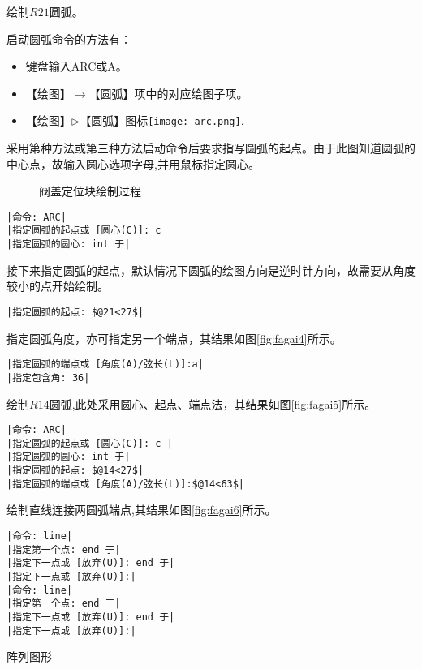 \begin{procedure}
绘制$R21$圆弧。

启动圆弧命令的方法有：
\begin{itemize}
\item 键盘输入ARC或A。
\item 【绘图】$\rightarrow$【圆弧】项中的对应绘图子项。
\item 【绘图】$\triangleright$【圆弧】图标\texttt{[image: arc.png]}.
\end{itemize}
采用第种方法或第三种方法启动命令后要求指写圆弧的起点。由于此图知道圆弧的中心点，故输入圆心选项字母,并用鼠标指定圆心。
\begin{figure}[htbp]
\centering
{}\hspace{30pt}
\hspace{30pt}
\caption{阀盖定位块绘制过程}
\end{figure}
\begin{lstlisting}
|命令: ARC|
|指定圆弧的起点或 [圆心(C)]: c 
|指定圆弧的圆心: int 于|
\end{lstlisting}
接下来指定圆弧的起点，默认情况下圆弧的绘图方向是逆时针方向，故需要从角度较小的点开始绘制。
\begin{lstlisting}
|指定圆弧的起点: $@21<27$|
\end{lstlisting}
指定圆弧角度，亦可指定另一个端点，其结果如图\ref{fig:fagai4}所示。
\begin{lstlisting}
|指定圆弧的端点或 [角度(A)/弦长(L)]:a|
|指定包含角: 36|
\end{lstlisting}
绘制$R14$圆弧,此处采用圆心、起点、端点法，其结果如图\ref{fig:fagai5}所示。
\begin{lstlisting}
|命令: ARC|
|指定圆弧的起点或 [圆心(C)]: c |
|指定圆弧的圆心: int 于|
|指定圆弧的起点: $@14<27$|
|指定圆弧的端点或 [角度(A)/弦长(L)]:$@14<63$|
\end{lstlisting}
绘制直线连接两圆弧端点,其结果如图\ref{fig:fagai6}所示。

\begin{lstlisting}
|命令: line|
|指定第一个点: end 于|
|指定下一点或 [放弃(U)]: end 于|
|指定下一点或 [放弃(U)]:|
|命令: line|
|指定第一个点: end 于|
|指定下一点或 [放弃(U)]: end 于|
|指定下一点或 [放弃(U)]:|
\end{lstlisting}
\item 阵列图形


\end{procedure}
